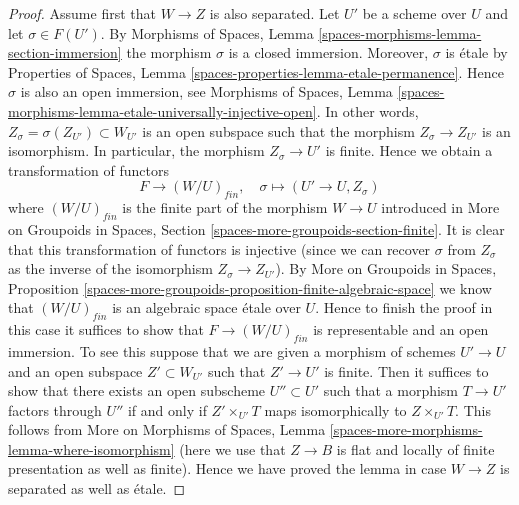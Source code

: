 \begin{proof}

Assume first that $W \to Z$ is also separated.
Let $U'$ be a scheme over $U$ and let $\sigma \in F(U')$. By
Morphisms of Spaces, Lemma \ref{spaces-morphisms-lemma-section-immersion}
the morphism $\sigma$ is a closed immersion.
Moreover, $\sigma$ is \'etale by
Properties of Spaces, Lemma \ref{spaces-properties-lemma-etale-permanence}.
Hence $\sigma$ is also an open immersion, see
Morphisms of Spaces,
Lemma \ref{spaces-morphisms-lemma-etale-universally-injective-open}.
In other words, $Z_\sigma = \sigma(Z_{U'}) \subset W_{U'}$ is
an open subspace such that the morphism $Z_\sigma \to Z_{U'}$
is an isomorphism. In particular, the morphism $Z_\sigma \to U'$
is finite. Hence we obtain a transformation of functors
$$
F \longrightarrow (W/U)_{fin}, \quad
\sigma \longmapsto (U' \to U, Z_\sigma)
$$
where $(W/U)_{fin}$ is the finite part of the morphism $W \to U$
introduced in
More on Groupoids in Spaces, Section
\ref{spaces-more-groupoids-section-finite}.
It is clear that this transformation of functors is injective (since we can
recover $\sigma$ from $Z_\sigma$ as the inverse of the isomorphism
$Z_\sigma \to Z_{U'}$). By
More on Groupoids in Spaces, Proposition
\ref{spaces-more-groupoids-proposition-finite-algebraic-space}
we know that $(W/U)_{fin}$ is an algebraic space \'etale over $U$.
Hence to finish the proof in this case it suffices to show that
$F \to (W/U)_{fin}$ is representable and an open immersion.
To see this suppose that we are given a morphism of schemes $U' \to U$
and an open subspace $Z' \subset W_{U'}$ such that $Z' \to U'$
is finite. Then it suffices to show that there exists an
open subscheme $U'' \subset U'$ such that a morphism
$T \to U'$ factors through $U''$ if and only if $Z' \times_{U'} T$
maps isomorphically to $Z \times_{U'} T$. This follows from
More on Morphisms of Spaces, Lemma
\ref{spaces-more-morphisms-lemma-where-isomorphism}
(here we use that $Z \to B$ is flat and locally of finite presentation
as well as finite).
Hence we have proved the lemma in case $W \to Z$ is separated
as well as \'etale.


\end{proof}
